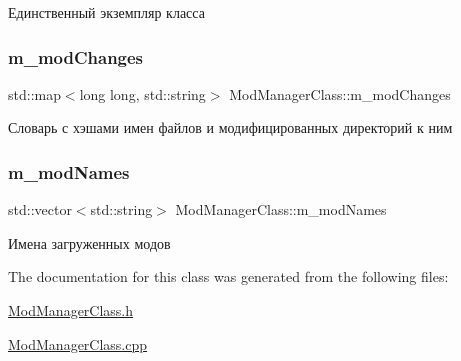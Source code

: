 Единственный экземпляр класса 

\mbox{\label{class_mod_manager_class_aaa66c302164a817e73152e0f12c9a8bc}} 
\subsubsection{\texorpdfstring{m\+\_\+mod\+Changes}{m\_modChanges}}
{\footnotesize\ttfamily std\+::map$<$long long, std\+::string$>$ Mod\+Manager\+Class\+::m\+\_\+mod\+Changes\hspace{0.3cm}{\ttfamily [private]}}



Словарь с хэшами имен файлов и модифицированных директорий к ним 

\mbox{\label{class_mod_manager_class_a7ddb5edbeb6a3b3caec4300e80c84d12}} 
\subsubsection{\texorpdfstring{m\+\_\+mod\+Names}{m\_modNames}}
{\footnotesize\ttfamily std\+::vector$<$std\+::string$>$ Mod\+Manager\+Class\+::m\+\_\+mod\+Names\hspace{0.3cm}{\ttfamily [private]}}



Имена загруженных модов 



The documentation for this class was generated from the following files\+:\begin{DoxyCompactItemize}
\item 
\hyperlink{_mod_manager_class_8h}{Mod\+Manager\+Class.\+h}\item 
\hyperlink{_mod_manager_class_8cpp}{Mod\+Manager\+Class.\+cpp}\end{DoxyCompactItemize}
